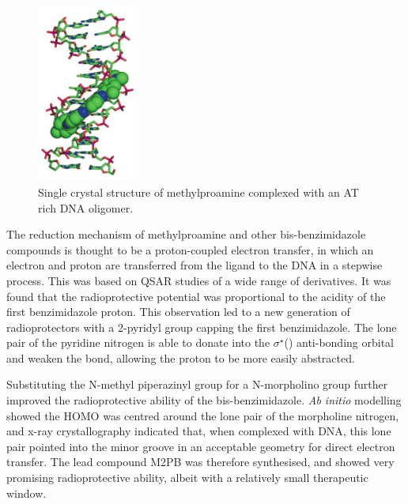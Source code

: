 \begin{refsection}
\begin{figure}
\includegraphics[width=0.3\textwidth]{Figures/mpa-dna-crystal.png}
\caption{Single crystal structure of methylproamine complexed with an AT rich DNA oligomer.}\label{fig:mpa-dna-crystal}
\end{figure}

The reduction mechanism of methylproamine and other bis-benzimidazole compounds is thought to be a proton-coupled electron transfer, in which an electron and proton are transferred from the ligand to the DNA in a stepwise process.
This was based on QSAR studies of a wide range of derivatives\autocite{Kakkar2005}.
It was found that the radioprotective potential was proportional to the acidity of the first benzimidazole proton.
This observation led to a new generation of radioprotectors with a 2-pyridyl group capping the first benzimidazole.
The lone pair of the pyridine nitrogen is able to donate into the $\sigma^{\star}$() anti-bonding orbital and weaken the bond, allowing the proton to be more easily abstracted.

Substituting the N-methyl piperazinyl group for a N-morpholino group further improved the radioprotective ability of the bis-benzimidazole.
\emph{Ab initio} modelling showed the HOMO was centred around the lone pair of the morpholine nitrogen, and x-ray crystallography indicated that, when complexed with DNA, this lone pair pointed into the minor groove in an acceptable geometry for direct electron transfer.
The lead compound M2PB  was therefore synthesised, and showed very promising radioprotective ability, albeit with a relatively small therapeutic window.


\end{refsection}

